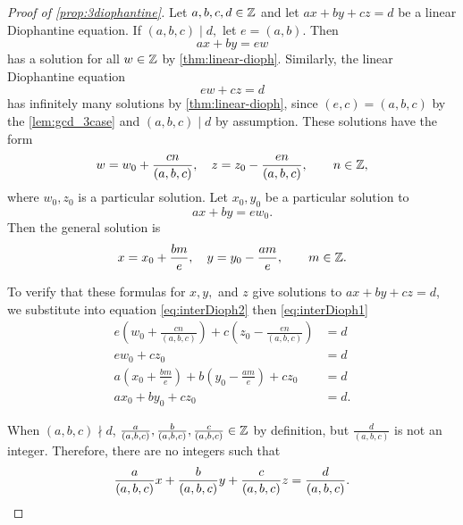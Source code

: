 \documentclass{ximera}
\begin{document}
\begin{proof}[Proof of \cref{prop:3diophantine}]
    Let $a,b,c,d\in\mathbb Z$ and let $ax+by+cz=d$ be a linear Diophantine equation. If $(a,b,c)\mid d,$ let $e=(a,b).$ 
    Then \begin{equation}\label{eq:interDioph1}ax+by=ew\end{equation} has a solution for all $w\in\mathbb Z$ by \cref{thm:linear-dioph}.
    Similarly, the linear Diophantine equation \begin{equation}\label{eq:interDioph2}
        ew+cz=d
    \end{equation} has infinitely many solutions by \cref{thm:linear-dioph}, since $(e,c)=(a,b,c)$ by the \cref{lem:gcd_3case} and $(a,b,c)\mid d$ by assumption. These solutions have the form 
    \[w=w_0+\frac{cn}{(a,b,c)},\quad z=z_0-\frac{en}{(a,b,c)},\qquad n\in\mathbb Z,\]
    where $w_0,z_0$ is a particular solution. Let $x_0,y_0$ be a particular solution to \[ax+by=ew_0.\] Then the general solution is 
    \[x=x_0+\frac{bm}{e},\quad y=y_0-\frac{am}{e},\qquad m\in\mathbb Z.\]

    To verify that these formulas for $x,y,$ and $z$ give solutions to $ax+by+cz=d$, we substitute into equation \ref{eq:interDioph2} then \ref{eq:interDioph1}
    \begin{align*}
        e\left(w_0+\frac{cn}{(a,b,c)}\right)+c\left(z_0-\frac{en}{(a,b,c)}\right)&=d\\
        e w_0 + c z_0 & =d\\
        a\left(x_0+\frac{bm}{e}\right)+b\left(y_0-\frac{am}{e}\right)+cz _0 &=d\\
        ax_0+by_0+c z_0&=d.
    \end{align*}

    When $(a,b,c)\nmid d$, $\frac{a}{(a,b,c)},\frac{b}{(a,b,c)},\frac{c}{(a,b,c)}\in\mathbb Z$ by definition, but $\frac{d}{(a,b,c)}$ is not an integer. Therefore, there are no integers such that \[\frac{a}{(a,b,c)}x+\frac{b}{(a,b,c)}y+\frac{c}{(a,b,c)}z=\frac{d}{(a,b,c)}. \qedhere\] 
\end{proof}
\end{document}

